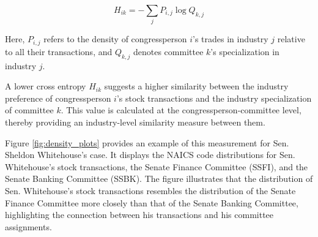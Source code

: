 \documentclass[15pt,letterpaper]{article}
\begin{document}
$$H_{i k}=-\sum_j P_{i, j} \log Q_{k, j}$$

Here, $P_{i,j}$ refers to the density of congressperson $i$'s trades in industry $j$ relative to all their transactions, and $Q_{k,j}$ denotes committee $k$'s specialization in industry $j$.

A lower cross entropy $H_{ik}$ suggests a higher similarity between the industry preference of congressperson $i$'s stock transactions and the industry specialization of committee $k$. This value is calculated at the congressperson-committee level, thereby providing an industry-level similarity measure between them.

Figure \ref{fig:density_plots} provides an example of this measurement for Sen. Sheldon Whitehouse's case. It displays the NAICS code distributions for Sen. Whitehouse's stock transactions, the Senate Finance Committee (SSFI), and the Senate Banking Committee (SSBK). The figure illustrates that the distribution of Sen. Whitehouse's stock transactions resembles the distribution of the Senate Finance Committee more closely than that of the Senate Banking Committee, highlighting the connection between his transactions and his committee assignments.
\end{document}
